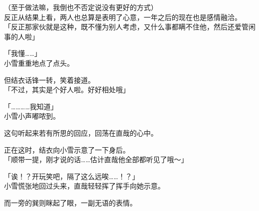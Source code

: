 （至于做法嘛，我倒也不否定说没有更好的方式）\\

反正从结果上看，两人也总算是表明了心意，一年之后的现在也是感情融洽。\\

「反正那家伙就是这种，既不懂为别人考虑，又什么事都瞒不住他，然后还爱管闲事的人啦」

「我懂……」\\

小雪重重地点了点头。

但结衣话锋一转，笑着接道。\\

「不过，其实是个好人啦。好好相处哦」

「…………我知道」\\

小雪小声嘟哝到。

这句听起来若有所思的回应，回荡在直哉的心中。

正在这时，结衣向小雪示意了一下身后。\\

「顺带一提，刚才说的话……估计直哉他全部都听见了哦～」

「诶！？开玩笑吧，隔了这么远唉……！？」\\

小雪慌张地回过头来，直哉轻轻挥了挥手向她示意。

而一旁的巽则眯起了眼，一副无语的表情。\\

